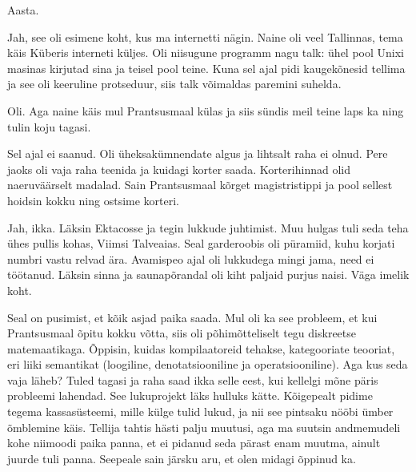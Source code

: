 
Aasta. 


Jah, see oli esimene koht, kus ma internetti nägin. Naine oli veel Tallinnas, 
tema käis Küberis interneti küljes. Oli niisugune programm nagu talk: 
ühel pool Unixi masinas kirjutad sina ja teisel pool teine. Kuna sel ajal pidi
kaugekõnesid tellima ja see oli keeruline protseduur, siis
talk võimaldas paremini suhelda.


Oli. Aga naine käis mul Prantsusmaal külas ja siis sündis meil teine 
laps ka ning tulin koju tagasi.


Sel ajal ei saanud. Oli üheksakümnendate algus ja lihtsalt raha ei olnud. Pere jaoks oli vaja raha teenida ja kuidagi korter saada. 
Korterihinnad olid naeruväärselt madalad. Sain 
Prantsusmaal kõrget magistristippi ja pool sellest hoidsin kokku 
ning ostsime korteri.


Jah, ikka. Läksin Ektacosse ja tegin lukkude juhtimist. 
Muu hulgas tuli seda teha ühes pullis kohas, Viimsi 
Talveaias. Seal garderoobis oli püramiid, kuhu korjati numbri vastu 
relvad ära. Avamispeo ajal oli lukkudega mingi jama, need ei töötanud. Läksin sinna ja saunapõrandal oli kiht paljaid purjus 
naisi. Väga imelik koht.
 
 
Seal on pusimist, et kõik asjad paika saada. Mul oli ka see 
probleem, et kui Prantsusmaal õpitu kokku võtta, siis oli põhimõtteliselt tegu diskreetse matemaatikaga. Õppisin, kuidas kompilaatoreid tehakse, 
kategooriate teooriat, eri liiki semantikat (loogiline, denotatsiooniline ja 
operatsiooniline). Aga kus seda vaja 
läheb? Tuled tagasi ja raha saad ikka selle eest, kui kellelgi mõne päris 
probleemi lahendad. See lukuprojekt läks hulluks kätte. Kõigepealt 
pidime tegema kassasüsteemi, mille külge tulid lukud, ja nii see pintsaku 
nööbi ümber õmblemine käis. Tellija tahtis hästi palju muutusi, aga ma suutsin andmemudeli kohe niimoodi paika panna, et ei pidanud seda 
pärast enam muutma, ainult juurde tuli panna. Seepeale sain järsku 
aru, et olen midagi õppinud ka.

